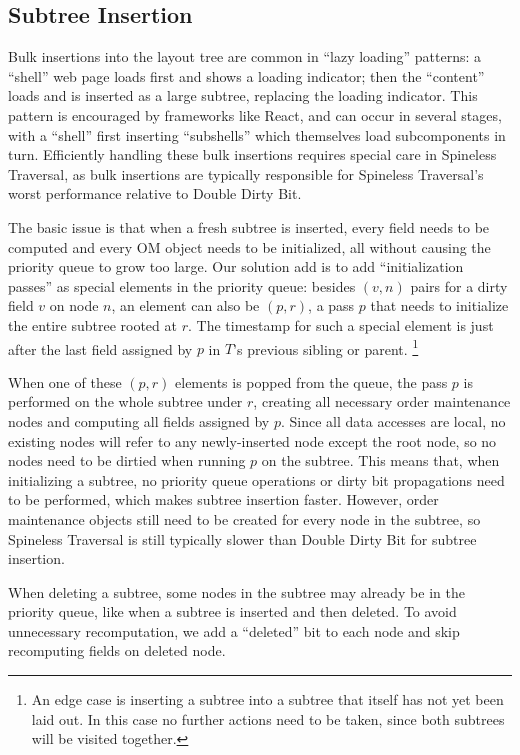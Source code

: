 \subsection{Subtree Insertion}
\label{sec:tree-insertion}

Bulk insertions into the layout tree
  are common in ``lazy loading'' patterns:
  a ``shell'' web page loads first and shows a loading indicator;
  then the ``content'' loads and is inserted as a large subtree,
  replacing the loading indicator.
This pattern is encouraged by frameworks like React,
  and can occur in several stages, with a ``shell''
  first inserting ``subshells'' which
  themselves load subcomponents in turn.
Efficiently handling these bulk insertions
  requires special care in Spineless Traversal,
  as bulk insertions are typically responsible
  for Spineless Traversal's worst performance
  relative to Double Dirty Bit.

The basic issue is that when a fresh subtree is inserted,
  every field needs to be computed
  and every OM object needs to be initialized,
  all without causing the priority queue to grow too large.
Our solution add is to add ``initialization passes''
  as special elements in the priority queue:
  besides $(v, n)$ pairs for a dirty field $v$ on node $n$,
  an element can also be $(p, r)$,
  a pass $p$ that needs to initialize the entire subtree rooted at $r$.
The timestamp for such a special element
  is just after the last field assigned by $p$
  in $T$'s previous sibling or parent.%
\footnote{
  An edge case is inserting a subtree into
    a subtree that itself has not yet been laid out.
  In this case no further actions need to be taken,
    since both subtrees will be visited together.}

When one of these $(p, r)$ elements is popped from the queue,
  the pass $p$ is performed on the whole subtree under $r$,
  creating all necessary order maintenance nodes
  and computing all fields assigned by $p$.
Since all data accesses are local,
  no existing nodes will refer to any newly-inserted node
  except the root node,
  so no nodes need to be dirtied when running $p$ on the subtree.
This means that, when initializing a subtree,
  no priority queue operations or dirty bit propagations
  need to be performed,
  which makes subtree insertion faster.
However, order maintenance objects still need to be created 
  for every node in the subtree,
  so Spineless Traversal is still
  typically slower than Double Dirty Bit for subtree insertion.

When deleting a subtree,
  some nodes in the subtree may
  already be in the priority queue,
  like when a subtree is inserted and then deleted.
To avoid unnecessary recomputation,
  we add a ``deleted'' bit to each node
  and skip recomputing fields on deleted node.
